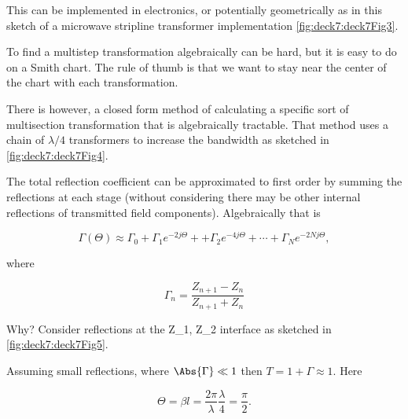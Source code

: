 This can be implemented in electronics, or potentially geometrically as in this sketch of a microwave stripline transformer implementation \cref{fig:deck7:deck7Fig3}.


To find a multistep transformation algebraically can be hard, but it is easy to do on a Smith chart.  The rule of thumb is that we want to stay near the center of the chart with each transformation.

There is however, a closed form method of calculating a specific sort of multisection transformation that is algebraically tractable.  That method uses a chain of \( \lambda/4 \) transformers to increase the bandwidth as sketched in \cref{fig:deck7:deck7Fig4}.


The total reflection coefficient can be approximated to first order by summing the reflections at each stage (without considering there may be other internal reflections of transmitted field components).  Algebraically that is

\begin{equation}\label{eqn:uwavesDeck7MultisectionTransformersCore:60}
\Gamma(\Theta) \approx \Gamma_0 
+ \Gamma_1 e^{-2 j \Theta} + 
+ \Gamma_2 e^{-4 j \Theta} +  \cdots
+ \Gamma_N e^{-2 N j \Theta},
\end{equation}

where

\begin{equation}\label{eqn:uwavesDeck7MultisectionTransformersCore:80}
\Gamma_n = \frac{Z_{n+1} - Z_n}{Z_{n+1} + Z_n}
\end{equation}

Why?  Consider reflections at the Z_1, Z_2 interface as sketched in \cref{fig:deck7:deck7Fig5}.


Assuming small reflections, where \( \Abs{\Gamma} \ll 1 \) then \( T = 1 + \Gamma \approx 1 \).  Here

\begin{dmath}\label{eqn:uwavesDeck7MultisectionTransformersCore:100}
\Theta 
= \beta l 
= \frac{2 \pi}{\lambda} \frac{\lambda}{4} 
= \frac{\pi}{2}.
\end{dmath}

